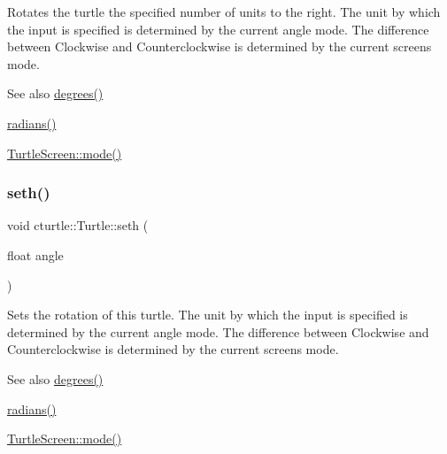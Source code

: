 Rotates the turtle the specified number of units to the right. The unit by which the input is specified is determined by the current angle mode. The difference between Clockwise and Counterclockwise is determined by the current screen\textquotesingle{}s mode. 

\begin{DoxySeeAlso}{See also}
\hyperlink{classcturtle_1_1Turtle_aa68704b24017c6a8cda41ff292ecafde}{degrees()} 

\hyperlink{classcturtle_1_1Turtle_a9c266e318f05dc5d45ddbeb830a373fa}{radians()} 

\hyperlink{classcturtle_1_1InteractiveTurtleScreen_a1c666afe65211cf9eedaffa17206a697}{Turtle\+Screen\+::mode()} 
\end{DoxySeeAlso}
\mbox{\label{classcturtle_1_1Turtle_a2f578819830001dfb6694813f9a4aa19}} 
\subsubsection{\texorpdfstring{seth()}{seth()}}
{\footnotesize\ttfamily void cturtle\+::\+Turtle\+::seth (\begin{DoxyParamCaption}\item[{float}]{angle }\end{DoxyParamCaption})\hspace{0.3cm}{\ttfamily [inline]}}



Sets the rotation of this turtle. The unit by which the input is specified is determined by the current angle mode. The difference between Clockwise and Counterclockwise is determined by the current screen\textquotesingle{}s mode. 

\begin{DoxySeeAlso}{See also}
\hyperlink{classcturtle_1_1Turtle_aa68704b24017c6a8cda41ff292ecafde}{degrees()} 

\hyperlink{classcturtle_1_1Turtle_a9c266e318f05dc5d45ddbeb830a373fa}{radians()} 

\hyperlink{classcturtle_1_1InteractiveTurtleScreen_a1c666afe65211cf9eedaffa17206a697}{Turtle\+Screen\+::mode()} 
\end{DoxySeeAlso}
\mbox{\label{classcturtle_1_1Turtle_a4eb2630341ea5bb922c74f214037b361}} 
